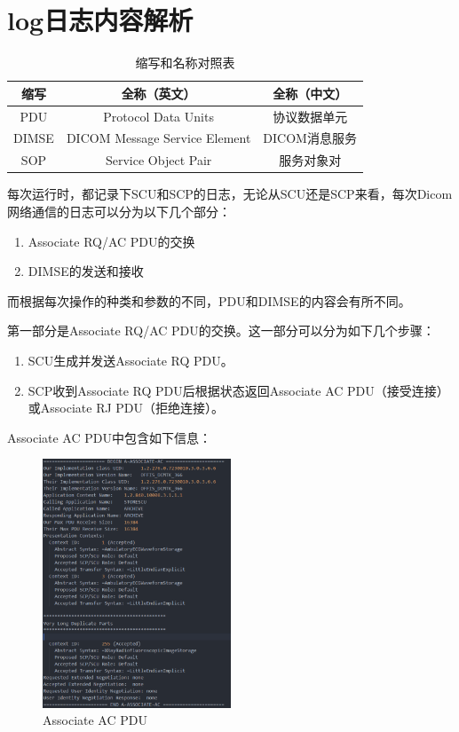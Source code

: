 \documentclass[UTF8]{ctexart}
\begin{document}
\section{log日志内容解析}

\begin{table}[H] 
    \centering  
    \caption{\label{tab:test}缩写和名称对照表}   
    \begin{tabular}{ccc}    
        \toprule    
        缩写 & 全称（英文） & 全称（中文） \\    
        \midrule   
        PDU & Protocol Data Units & 协议数据单元 \\   
        DIMSE & DICOM Message Service Element & DICOM消息服务 \\   
        SOP & Service Object Pair & 服务对象对 \\
        \bottomrule   
    \end{tabular}  
\end{table}

每次运行时，都记录下SCU和SCP的日志，无论从SCU还是SCP来看，每次Dicom网络通信的日志可以分为以下几个部分：
\begin{enumerate}
    \item Associate RQ/AC PDU的交换
    \item DIMSE的发送和接收
\end{enumerate}
而根据每次操作的种类和参数的不同，PDU和DIMSE的内容会有所不同。

第一部分是Associate RQ/AC PDU的交换。这一部分可以分为如下几个步骤：
\begin{enumerate}
    \item SCU生成并发送Associate RQ PDU。
    \item SCP收到Associate RQ PDU后根据状态返回Associate AC PDU（接受连接）或Associate RJ PDU（拒绝连接）。
\end{enumerate}
Associate AC PDU中包含如下信息：
\begin{figure}[H]
    \centering
    \includegraphics[width=0.5\textwidth]{PDU.png}
    \caption{Associate AC PDU}
    \label{fig: log PDU}
\end{figure}
\end{document}
